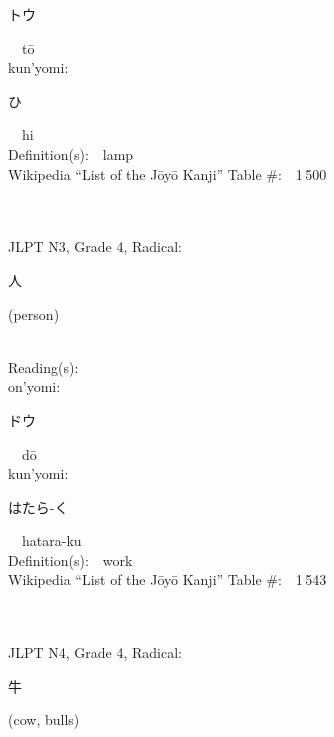 \begin{multicols}{2}
{\hspace*{2em}}{\begin{CJK}{UTF8}{min} トウ \end{CJK}}\ \ t\=o\ \ \\
{\hspace*{1em}}kun'yomi:\ \ \\
{\hspace*{2em}}{\begin{CJK}{UTF8}{min} ひ \end{CJK}}\ \ hi\ \ \\
Definition(s):\ \ lamp \\
Wikipedia ``List of the J\=oy\=o Kanji'' Table \#:\ \ 1\,500 \\
\ \ \\
{\fontsize{34pt}{40pt}  }\ \ \\  %
{JLPT N3, Grade 4, Radical:\ \ {\begin{CJK}{UTF8}{min} 人 \end{CJK}} (person) } \\
Reading(s):\ \ \\
{\hspace*{1em}}on'yomi:\ \ \\
{\hspace*{2em}}{\begin{CJK}{UTF8}{min} ドウ \end{CJK}}\ \ d\=o\ \ \\
{\hspace*{1em}}kun'yomi:\ \ \\
{\hspace*{2em}}{\begin{CJK}{UTF8}{min} はたら-く \end{CJK}}\ \ hatara-ku\ \ \\
Definition(s):\ \ work \\
Wikipedia ``List of the J\=oy\=o Kanji'' Table \#:\ \ 1\,543 \\
\ \ \\
{\fontsize{34pt}{40pt}  }\ \ \\  %
{JLPT N4, Grade 4, Radical:\ \ {\begin{CJK}{UTF8}{min} 牛 \end{CJK}} (cow, bulls) } \\

\end{multicols}
